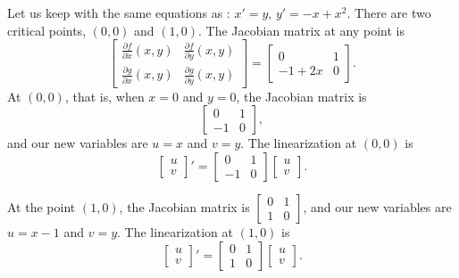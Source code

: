 \begin{example} \label{example:nlin-1b-examplelin}
Let us keep with the same equations as :
$x' = y$, $y' = -x+x^2$.  There are two critical points, $(0,0)$
and $(1,0)$.  The Jacobian matrix at any point is
\begin{equation*}
\begin{bmatrix}
\frac{\partial f}{\partial x}(x,y) &
\frac{\partial f}{\partial y}(x,y) \\
\frac{\partial g}{\partial x}(x,y) &
\frac{\partial g}{\partial y}(x,y)
\end{bmatrix} =
\begin{bmatrix}
0 & 1 \\
-1+2x & 0
\end{bmatrix}.
\end{equation*}
At $(0,0)$, that is, when $x=0$ and $y=0$, the Jacobian matrix is
\begin{equation*}
\begin{bmatrix}
0 & 1 \\
-1 & 0
\end{bmatrix} ,
\end{equation*}
and our new variables are
$u=x$ and $v=y$.  The linearization at $(0,0)$ is
\begin{equation*}
\begin{bmatrix} u \\ v \end{bmatrix} ' =
\begin{bmatrix}
0 & 1 \\
-1 & 0
\end{bmatrix}
\begin{bmatrix} u \\ v \end{bmatrix} .
\end{equation*}

At the point $(1,0)$, the Jacobian
matrix is
$\left[ \begin{smallmatrix}
0 & 1 \\
1 & 0
\end{smallmatrix} \right]$,
and our new variables are
$u=x-1$ and $v=y$.
The linearization at $(1,0)$ is
\begin{equation*}
\begin{bmatrix} u \\ v \end{bmatrix} ' =
\begin{bmatrix}
0 & 1 \\
1 & 0
\end{bmatrix}
\begin{bmatrix} u \\ v \end{bmatrix} .
\end{equation*}


\end{example}
